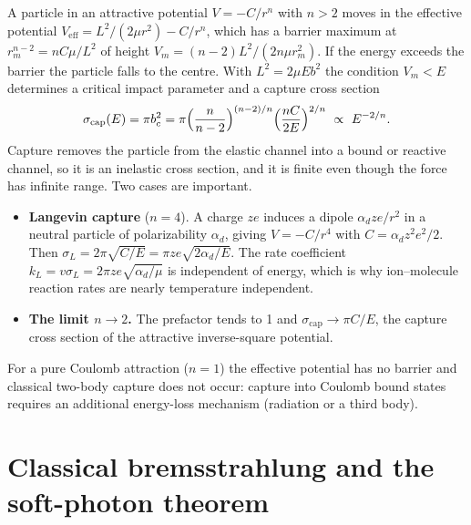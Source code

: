 \documentclass[11pt,a4paper]{book}
\numberwithin{equation}{chapter}
\begin{document}
A particle in an attractive potential $V=-C/r^n$ with $n>2$ moves in the
effective potential $V_{\mathrm{eff}}=L^2/(2\mu r^2)-C/r^n$, which has a barrier
maximum at $r_m^{n-2}=nC\mu/L^2$ of height $V_m=(n-2)L^2/(2n\mu r_m^2)$. If the
energy exceeds the barrier the particle falls to the centre. With
$L^2=2\mu Eb^2$ the condition $V_m<E$ determines a critical impact parameter and
a capture cross section
\begin{equation}\label{eq:sigcap}
  \sigma_{\mathrm{cap}}(E)=\pi b_c^2=\pi\Bigl(\frac{n}{n-2}\Bigr)^{(n-2)/n}
     \Bigl(\frac{nC}{2E}\Bigr)^{2/n}\ \propto\ E^{-2/n}.
\end{equation}
Capture removes the particle from the elastic channel into a bound or reactive
channel, so it is an inelastic cross section, and it is finite even though the
force has infinite range. Two cases are important.
\begin{itemize}
  \item \textbf{Langevin capture} ($n=4$). A charge $ze$ induces a dipole
        $\alpha_dze/r^2$ in a neutral particle of polarizability $\alpha_d$,
        giving $V=-C/r^4$ with $C=\alpha_dz^2e^2/2$. Then
        $\sigma_L=2\pi\sqrt{C/E}=\pi ze\sqrt{2\alpha_d/E}$. The rate coefficient
        $k_L=v\sigma_L=2\pi ze\sqrt{\alpha_d/\mu}$ is independent of energy, which is why
        ion--molecule reaction rates are nearly temperature independent.
  \item \textbf{The limit $n\to2$.} The prefactor tends to 1 and
        $\sigma_{\mathrm{cap}}\to\pi C/E$, the capture cross section of the
        attractive inverse-square potential.
\end{itemize}
For a pure Coulomb attraction ($n=1$) the effective potential has no barrier
and classical two-body capture does not occur: capture into Coulomb bound states
requires an additional energy-loss mechanism (radiation or a third body).

\section{Classical bremsstrahlung and the soft-photon theorem}\label{sec:soft}
\end{document}
